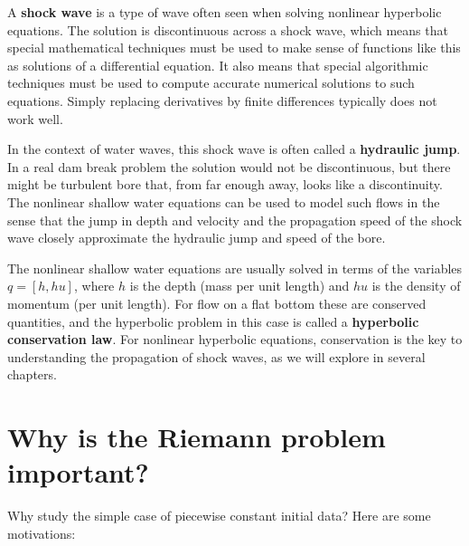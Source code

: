 \documentclass{SIAMbook2016}
\begin{document}
A \textbf{shock wave} is a type of wave often seen when solving
nonlinear hyperbolic equations. The solution is discontinuous across a
shock wave, which means that special mathematical techniques must be
used to make sense of functions like this as solutions of a differential
equation. It also means that special algorithmic techniques must be used
to compute accurate numerical solutions to such equations. Simply
replacing derivatives by finite differences typically does not work
well.

In the context of water waves, this shock wave is often called a
\textbf{hydraulic jump}. In a real dam break problem the solution would
not be discontinuous, but there might be turbulent bore that, from far
enough away, looks like a discontinuity. The nonlinear shallow water
equations can be used to model such flows in the sense that the jump in
depth and velocity and the propagation speed of the shock wave closely
approximate the hydraulic jump and speed of the bore.

The nonlinear shallow water equations are usually solved in terms of the
variables \(q = [h, hu]\), where \(h\) is the depth (mass per unit
length) and \(hu\) is the density of momentum (per unit length). For
flow on a flat bottom these are conserved quantities, and the hyperbolic
problem in this case is called a \textbf{hyperbolic conservation law}.
For nonlinear hyperbolic equations, conservation is the key to
understanding the propagation of shock waves, as we will explore in
several chapters.

\hypertarget{why-is-the-riemann-problem-important}{%
\section{Why is the Riemann problem
important?}\label{why-is-the-riemann-problem-important}}

Why study the simple case of piecewise constant initial data? Here are
some motivations:
\end{document}
